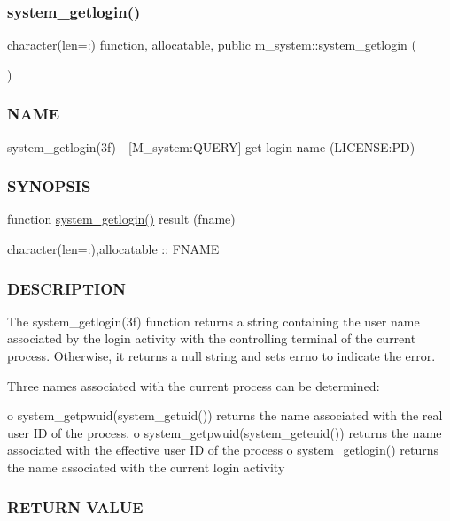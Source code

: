 \subsubsection{\texorpdfstring{system\+\_\+getlogin()}{system\_getlogin()}}
{\footnotesize\ttfamily character(len=\+:) function, allocatable, public m\+\_\+system\+::system\+\_\+getlogin (\begin{DoxyParamCaption}{ }\end{DoxyParamCaption})}



\subsubsection*{N\+A\+ME}

system\+\_\+getlogin(3f) -\/ \mbox{[}M\+\_\+system\+:Q\+U\+E\+RY\mbox{]} get login name (L\+I\+C\+E\+N\+SE\+:PD) 

\subsubsection*{S\+Y\+N\+O\+P\+S\+IS}

function \mbox{\hyperlink{namespacem__system_a70f78645a1f130734005e190d469529d}{system\+\_\+getlogin()}} result (fname)

character(len=\+:),allocatable \+:\+: F\+N\+A\+ME

\subsubsection*{D\+E\+S\+C\+R\+I\+P\+T\+I\+ON}

\begin{DoxyVerb}The system_getlogin(3f) function returns a string containing the user
name associated by the login activity with the controlling terminal
of the current process. Otherwise, it returns a null string and sets
errno to indicate the error.

Three names associated with the current process can be determined:

   o system_getpwuid(system_getuid()) returns the name associated with the real user ID of the process.
   o system_getpwuid(system_geteuid()) returns the name associated with the effective user ID of the process
   o system_getlogin() returns the name associated with the current login activity
\end{DoxyVerb}


\subsubsection*{R\+E\+T\+U\+RN V\+A\+L\+UE}

